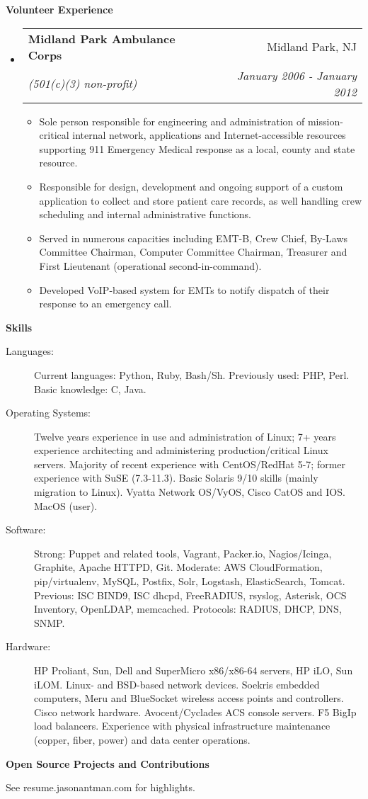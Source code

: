\documentclass[letterpaper,11pt]{article}
\makeatletter
\newcommand{\resitem}[1]{\item #1 \vspace{-2pt}}
\newcommand{\resheading}[1]{{\large \colorbox{mygrey}{\begin{minipage}{\textwidth}{\textbf{#1 \vphantom{p\^{E}}}}\end{minipage}}}}
\newcommand{\ressubheading}[4]{
\begin{tabular*}{7.0in}{l@{\extracolsep{\fill}}r}
		\textbf{#1} & #2 \\
		\textit{#3} & \textit{#4} \\
\end{tabular*}\vspace{-6pt}}
\makeatother
\begin{document}
\resheading{Volunteer Experience}
\begin{itemize}
\item
        \ressubheading{Midland Park Ambulance Corps}{Midland Park, NJ}{(501(c)(3) non-profit)}{January 2006 - January 2012}
        \begin{itemize}
                \resitem{Sole person responsible for engineering and administration of
                  mission-critical internal network, applications and
                  Internet-accessible resources supporting 911 Emergency
                  Medical response as a local, county and state resource.}
                \resitem{Responsible for design, development and ongoing support of a custom application to
                  collect and store patient care records, as well handling crew scheduling and internal
                  administrative functions.}
                \resitem{Served in numerous capacities including EMT-B, Crew Chief,
                  By-Laws Committee Chairman, Computer Committee Chairman,
                  Treasurer and First Lieutenant (operational second-in-command).}
                \resitem{Developed VoIP-based system for EMTs to notify
                  dispatch of their response to an emergency call.}
        \end{itemize}
\end{itemize}

\resheading{Skills}

\begin{description}
\item[Languages:]
Current languages: Python, Ruby, Bash/Sh. Previously used: PHP, Perl. Basic knowledge: C, Java.
\item[Operating Systems:]
Twelve years experience in use and administration of Linux; 7+ years experience architecting and administering production/critical Linux servers.
Majority of recent experience with CentOS/RedHat 5-7; former experience with SuSE
(7.3-11.3). Basic Solaris 9/10 skills (mainly migration to Linux). Vyatta Network OS/VyOS, Cisco CatOS and IOS. MacOS (user).
\item[Software:]
Strong: Puppet and related tools, Vagrant, Packer.io, Nagios/Icinga, Graphite, Apache HTTPD, Git.
Moderate: AWS CloudFormation, pip/virtualenv, MySQL, Postfix, Solr, Logstash, ElasticSearch, Tomcat.
Previous: ISC BIND9, ISC dhcpd, FreeRADIUS, rsyslog, Asterisk, OCS Inventory, OpenLDAP, memcached. Protocols: RADIUS, DHCP, DNS, SNMP.

\item[Hardware:]
HP Proliant, Sun, Dell and SuperMicro x86/x86-64 servers, HP iLO, Sun iLOM. Linux- and
BSD-based network devices. Soekris embedded computers, Meru and BlueSocket
wireless access points and controllers. Cisco network hardware. Avocent/Cyclades ACS console servers. F5 BigIp load balancers. Experience with physical infrastructure maintenance (copper, fiber, power) and data center operations.
\end{description}

\resheading{Open Source Projects and Contributions}
\begin{description}
\item{See resume.jasonantman.com for highlights.}
\end{description}
\end{document}
